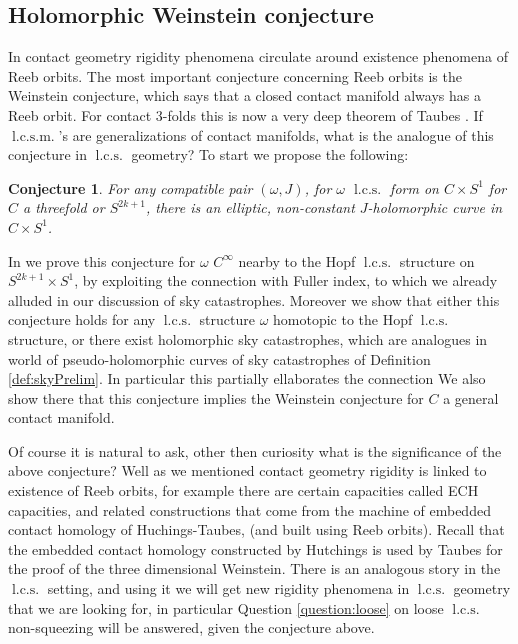 \documentclass{amsart}
\numberwithin{equation}{section}
\newtheorem{conjecture}{Conjecture}
\theoremstyle{definition}
\theoremstyle{remark}
\DeclareMathOperator{\lcs}{l.c.s.}
\DeclareMathOperator{\lcsm}{l.c.s.m.}
\begin{document}
\subsection {Holomorphic Weinstein conjecture} In contact geometry rigidity phenomena circulate around existence phenomena of Reeb orbits. The most important conjecture concerning Reeb orbits is the Weinstein conjecture, which says that a closed contact manifold always has a Reeb orbit. For contact 3-folds this is now a very deep theorem of Taubes \cite{citeTaubesWeinsteinconjecture}.
If $\lcsm$'s are generalizations of contact manifolds, what is the analogue of this conjecture in $\lcs$ geometry?
To start we propose the following:
\begin{conjecture} \label{conj:Hol} For any compatible pair  $(\omega, J)$, for $\omega$ $\lcs$ form on $C \times S ^{1}  $ for $C$ a threefold or $S ^{2k+1} $, there is an elliptic, non-constant $J$-holomorphic curve in $C \times S ^{1}  $.
\end{conjecture}
In \cite{citeSavelyevConformalSymplectic} we prove this conjecture for $\omega$ $C ^{\infty} $ nearby to the Hopf $\lcs$ structure on $S ^{2k+1} \times S ^{1}  $, by exploiting the connection with Fuller index, to which we already alluded in our discussion of sky catastrophes. Moreover we show that either this conjecture holds for any $\lcs$ structure $\omega$ homotopic to the Hopf $\lcs$ structure, or there exist holomorphic sky catastrophes, which are analogues in world of pseudo-holomorphic curves of sky catastrophes of Definition \ref{def:skyPrelim}. 
In particular this partially ellaborates the connection 
We also show there that this conjecture implies the Weinstein conjecture for $C$ a general contact manifold.


Of course it is natural to ask, other then curiosity what is the significance of the above conjecture? Well as we mentioned contact geometry rigidity is linked to existence of Reeb orbits, for example there are certain capacities called ECH capacities, and related constructions \cite{citeHutchingsBeyond} that come from the machine of embedded contact homology of Huchings-Taubes, (and built using Reeb orbits). Recall that the embedded contact homology 
constructed by Hutchings is used by Taubes for the proof of the three dimensional Weinstein.
There is an analogous story in the $\lcs$ setting, and using it we will get new rigidity phenomena in $\lcs$ geometry that we are looking for, in particular Question \ref{question:loose} on loose $\lcs$ non-squeezing will be answered, given the conjecture above.
\end{document}
